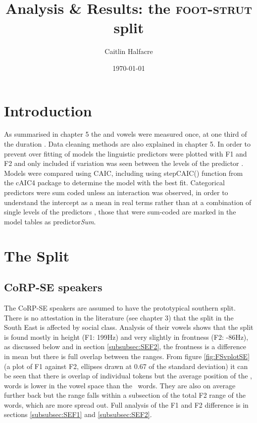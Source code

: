 \documentclass[../../../00.FullDoc/tex/ThesisSkeleton-draft2]{subfiles}
\title{Analysis \& Results: the \textsc{foot}-\textsc{strut} split}
\author{Caitlin Halfacre}
\date{\today}
\begin{document}
	\newcommand{\onlyinsubfile}[1]{#1}
	\newcommand{\notinsubfile}[1]{}
		\maketitle
		\pagebreak
		\tableofcontents
		\onehalfspacing
	\pagestyle{scrheadings}
	
\section{Introduction} \label{sec:FSintro}

As summarised in chapter \onlyinsubfile{5}\notinsubfile{\ref{ch:Methodology}} the \foot{} and \strutt{} vowels were measured once, at one third of the duration \citep{FAVE}. Data cleaning methods are also explained in chapter \onlyinsubfile{5}\notinsubfile{\ref{ch:Methodology}}.
In order to prevent over fitting of models the linguistic predictors were plotted with F1 and F2 and only included if variation was seen between the levels of the predictor . Models were compared using CAIC, including using stepCAIC() function from the cAIC4 package \citep{cAIC4} to determine the model with the best fit. Categorical predictors were sum coded unless an interaction was observed, in order to understand the intercept as a mean in real terms rather than at a combination of single levels of the predictors \cite{Winter2019}, those that were sum-coded are marked in the model tables as predictor\textit{Sum}.
 
\section{The Split}	 \label{sec:FSSplit}
\subsection{CoRP-SE speakers}
The CoRP-SE speakers are assumed to have the prototypical southern \FS{} split. There is no attestation in the literature (see chapter \onlyinsubfile{3}\notinsubfile{\ref{ch:LitReviewSocio}}) that the split in the South East is affected by social class. Analysis of their vowels shows that the split is found mostly in height (F1: 199Hz) and very slightly in frontness (F2: -86Hz), as discussed below and in section \ref{subsubsec:SEF2}, the frontness is a difference in mean but there is full overlap between the ranges.
From figure \ref{fig:FSvplotSE} (a plot of F1 against F2, ellipses drawn at 0.67 of the standard deviation) it can be seen that there is overlap of individual tokens but the average position of the \strutt{}, words is lower in the vowel space than the \foot\, words. They are also on average further back but the range falls within a subsection of the total F2 range of the  \foot{} words, which are more spread out.
Full analysis of the F1 and F2 difference is in sections \ref{subsubsec:SEF1} and \ref{subsubsec:SEF2}.
\end{document}
